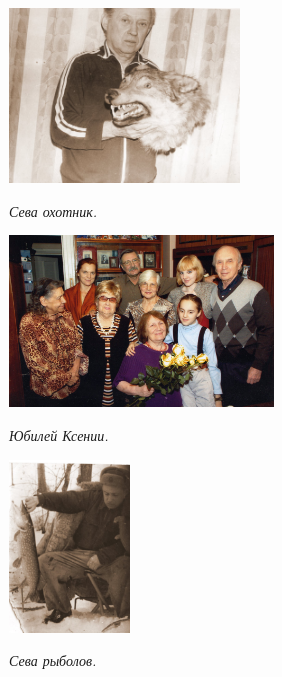 \documentclass[utf8x, 12pt]{G7-32a} %
\begin{document}
\vspace{5pt}

\begin{figure}[h!]
    \begin{minipage}[h!]{61mm}
         \vspace{10pt}
         \begin{center}
         \vspace{-15pt}
         \includegraphics[width=61mm]{inc/Varzar/31.jpg} 
         \end{center}
         \vspace{-10pt}
         \itshape{Сева охотник.}
    \end{minipage}
    \hfill
   \begin{minipage}[h]{65mm}
       \begin{center}
       \includegraphics[width=70mm]{inc/Varzar/32.jpg} 
       \end{center}
                \vspace{-10pt}
       \itshape{Юбилей Ксении.}
   \end{minipage}
   \hfill
    \begin{minipage}[h!]{32mm}
        \begin{center}
        \includegraphics[width=32mm]{inc/Varzar/33.jpg}
        \end{center}
                 \vspace{-10pt}
        \itshape{Сева рыболов.}
    \end{minipage}
\end{figure}
\end{document}
